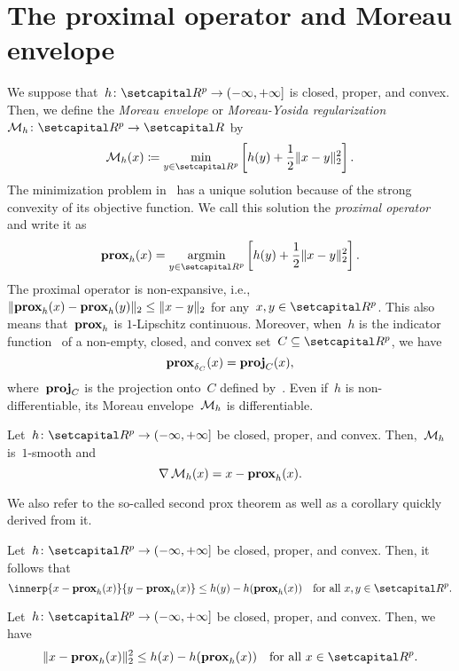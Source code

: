 \documentclass[../main]{subfiles}
\begin{document}
\section{The proximal operator and Moreau envelope}
We suppose that~$h \colon \setR^p \to (-\infty, +\infty]$ is closed, proper, and convex.
Then, we define the \emph{Moreau envelope} or \emph{Moreau-Yosida regularization}~$\envelope_h \colon \setR^p \to \setR$ by
\begin{equation} \label{eq:Moreau_env}
    \envelope_h(x) \coloneqq \min_{y \in \setR^p} \left[ h(y) + \frac{1}{2} \norm{x - y}_2^2 \right] 
.\end{equation} 
The minimization problem in~ has a unique solution because of the strong convexity of its objective function.
We call this solution the \emph{proximal operator} and write it as
\begin{equation} \label{eq:prox}
    \prox_h(x) = \argmin_{y \in \setR^p} \left[ h(y) + \frac{1}{2} \norm{x - y}_2^2 \right] 
.\end{equation} 
The proximal operator is non-expansive, i.e.,~$\lVert\operatorname{\mathbf{prox}}_h(x) - \operatorname{\mathbf{prox}}_h(y)\rVert_2 \le \lVert x - y\rVert_2$ for any~$x, y \in \setR^p$.
This also means that~$\operatorname{\mathbf{prox}}_h$ is $1$-Lipschitz continuous.
Moreover, when~$h$ is the indicator function~ of a non-empty, closed, and convex set~$C \subseteq \setR^p$, we have
\begin{equation} \label{eq:prox_ind}
    \operatorname{\mathbf{prox}}_{\operatorname{\delta}_C}(x) = \operatorname{\mathbf{proj}}_C(x)
,\end{equation} 
where~$\operatorname{\mathbf{proj}}_C$ is the projection onto~$C$ defined by~.
Even if~$h$ is non-differentiable, its Moreau envelope~$\operatorname{\mathcal{M}}_h$ is differentiable.
\begin{theorem} 
    Let~$h \colon \setR^p \to (-\infty, +\infty]$ be closed, proper, and convex.
    Then,~$\operatorname{\mathcal{M}}_h$ is~$1$-smooth and
    \begin{equation}
        \nabla \operatorname{\mathcal{M}}_h(x) = x - \operatorname{\mathbf{prox}}_h(x)
    .\end{equation} 
\end{theorem}
We also refer to the so-called second prox theorem as well as a corollary quickly derived from it.
\begin{theorem} 
    Let~$h \colon \setR^p \to (-\infty, +\infty]$ be closed, proper, and convex.
    Then, it follows that
    \begin{equation}
        \innerp{x - \prox_h(x)}{y - \prox_h(x)} \le h(y) - h(\prox_h(x)) \forallcondition{x, y \in \setR^p}
    .\end{equation} 
\end{theorem}
\begin{corollary} 
    Let~$h \colon \setR^p \to (-\infty, +\infty]$ be closed, proper, and convex.
    Then, we have
    \begin{equation}
        \norm{x - \prox_h(x)}_2^2 \le h(x) - h(\prox_h(x)) \forallcondition{x \in \setR^p}
    .\end{equation} 
\end{corollary}
\end{document}
